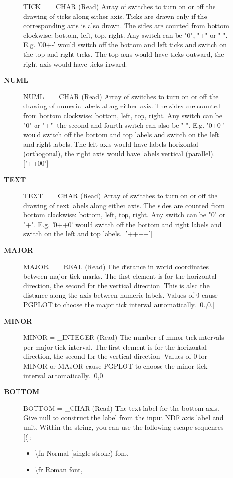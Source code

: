 \begin{description}
\begin{description}
TICK = \_CHAR (Read)
   Array of switches to turn on or off the drawing of ticks along
   either axis. Ticks are drawn only if the corresponding axis is
   also drawn. The sides are counted from bottom clockwise:
   bottom, left, top, right. Any switch can be "0", "+" or
   "-". E.g. '00+-' would switch off the bottom and left ticks and
   switch on the top and right ticks. The top axis would have
   ticks outward, the right axis would have ticks inward.
\item [\textbf{NUML}]
NUML = \_CHAR (Read)
   Array of switches to turn on or off the drawing of numeric
   labels along either axis. The sides are counted from bottom
   clockwise: bottom, left, top, right. Any switch can be "0" or
   "+"; the second and fourth switch can also be "-". E.g. '0+0-'
   would switch off the bottom and top labels and switch on the
   left and right labels. The left axis would have labels
   horizontal (orthogonal), the right axis would have labels
   vertical (parallel). ['++00']
\item [\textbf{TEXT}]
TEXT = \_CHAR (Read)
   Array of switches to turn on or off the drawing of text labels
   along either axis. The sides are counted from bottom clockwise:
   bottom, left, top, right. Any switch can be "0" or "+".
   E.g. '0++0' would switch off the bottom and right labels and
   switch on the left and top labels. ['++++']
\item [\textbf{MAJOR}]
MAJOR = \_REAL (Read)
   The distance in world coordinates between major tick marks. The
    first element is for the horizontal direction, the second for
    the vertical direction. This is also the distance along the
    axis between numeric labels. Values of 0 cause PGPLOT to choose
    the major tick interval automatically. [0.,0.]
\item [\textbf{MINOR}]
MINOR = \_INTEGER (Read)
   The number of minor tick intervals per major tick interval. The
   first element is for the horizontal direction, the second for
   the vertical direction. Values of 0 for MINOR or MAJOR cause
   PGPLOT to choose the minor tick interval automatically. [0,0]
\item [\textbf{BOTTOM}]
BOTTOM = \_CHAR (Read)
   The text label for the bottom axis. Give null to construct the
   label from the input NDF axis label and unit. Within the
   string, you can use the following escape sequences [!]:
   \begin{itemize}
   \item \textbackslash fn Normal (single stroke) font,
   \item \textbackslash fr Roman font,

\end{itemize}
\end{description}
\end{description}
